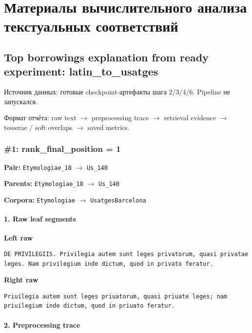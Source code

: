
\chapter{Материалы вычислительного анализа текстуальных соответствий}

\section{Top borrowings explanation from ready experiment: latin\_to\_usatges}

Источник данных: готовые checkpoint-артефакты шага 2/3/4/6. Pipeline не запускался.

Формат отчёта: raw text $\rightarrow$ preprocessing trace $\rightarrow$ retrieval evidence $\rightarrow$ tesserae / soft overlaps $\rightarrow$ saved metrics.

\subsection{\#1: rank\_final\_position = 1}

\textbf{Pair:} \texttt{Etymologiae\_18} $\rightarrow$ \texttt{Us\_140}

\textbf{Parents:} \texttt{Etymologiae\_18} $\rightarrow$ \texttt{Us\_140}

\textbf{Corpora:} \texttt{Etymologiae} $\rightarrow$ \texttt{UsatgesBarcelona}

\subsubsection{1. Raw leaf segments}

\textbf{Left raw} 

\begin{lstlisting}[breaklines=true,basicstyle=\ttfamily\small]
DE PRIVILEGIIS. Privilegia autem sunt leges privatorum, quasi privatae leges. Nam privilegium inde dictum, quod in privato feratur.
\end{lstlisting}

\textbf{Right raw} 

\begin{lstlisting}[breaklines=true,basicstyle=\ttfamily\small]
Priuilegia autem sunt leges priuatorum, quasi priuate leges; nam priuilegium inde dictum, quod in priuato feratur.
\end{lstlisting}

\subsubsection{2. Preprocessing trace}

